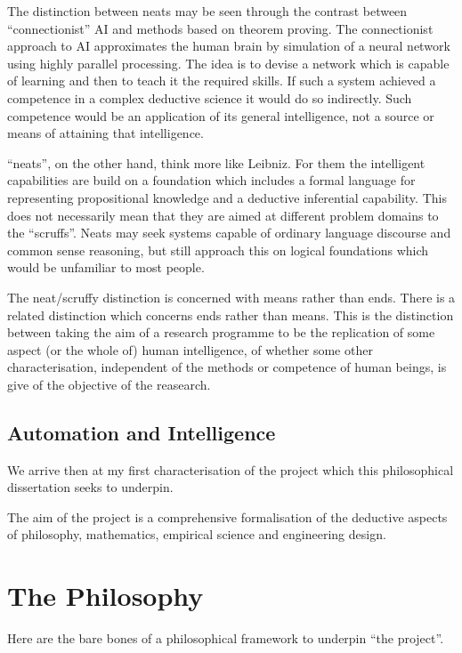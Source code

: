 The distinction between neats may be seen through the contrast between ``connectionist'' AI and methods based on theorem proving.
The connectionist approach to AI approximates the human brain by simulation of a neural network using highly parallel processing.
The idea is to devise a network which is capable of learning and then to teach it the required skills.
If such a system achieved a competence in a complex deductive science it would do so indirectly.
Such competence would be an application of its general intelligence, not a source or means of attaining that intelligence.

``neats'', on the other hand, think more like Leibniz.
For them the intelligent capabilities are build on a foundation which includes a formal language for representing propositional knowledge and a deductive inferential capability.
This does not necessarily mean that they are aimed at different problem domains to the ``scruffs''.
Neats may seek systems capable of ordinary language discourse and common sense reasoning, but still approach this on logical foundations which would be unfamiliar to most people.

The neat/scruffy distinction is concerned with means rather than ends.
There is a related distinction which concerns ends rather than means.
This is the distinction between taking the aim of a research programme to be the replication of some aspect (or the whole of) human intelligence, of whether some other characterisation, independent of the methods or competence of human beings, is give of the objective of the reasearch.

\subsection{Automation and Intelligence}\label{AutomationAndIntelligence}

We arrive then at my first characterisation of the project which this philosophical dissertation seeks to underpin.

The aim of the project is a comprehensive formalisation of the deductive aspects of philosophy, mathematics, empirical science and engineering design.



\section{The Philosophy}\label{ThePhilosophy}

Here are the bare bones of a philosophical framework to underpin ``the project''.

